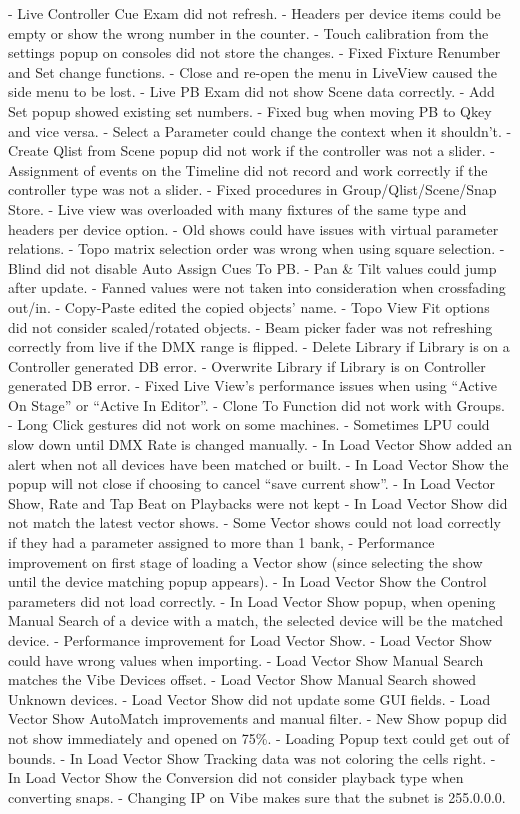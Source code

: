 \documentclass[
]{article}
\begin{document}
- Live Controller Cue Exam did not refresh.
- Headers per device items could be empty or show the wrong number in the counter.
- Touch calibration from the settings popup on consoles did not store the changes.
- Fixed Fixture Renumber and Set change functions.
- Close and re-open the menu in LiveView caused the side menu to be lost.
- Live PB Exam did not show Scene data correctly.
- Add Set popup showed existing set numbers.
- Fixed bug when moving PB to Qkey and vice versa.
- Select a Parameter could change the context when it shouldn't.
- Create Qlist from Scene popup did not work if the controller was not a slider.
- Assignment of events on the Timeline did not record and work correctly if the controller type was not a slider.
- Fixed procedures in Group/Qlist/Scene/Snap Store.
- Live view was overloaded with many fixtures of the same type and headers per device option.
- Old shows could have issues with virtual parameter relations.
- Topo matrix selection order was wrong when using square selection.
- Blind did not disable Auto Assign Cues To PB.
- Pan \& Tilt values could jump after update.
- Fanned values were not taken into consideration when crossfading out/in.
- Copy-Paste edited the copied objects' name.
- Topo View Fit options did not consider scaled/rotated objects.
- Beam picker fader was not refreshing correctly from live if the DMX range is flipped.
- Delete Library if Library is on a Controller generated DB error.
- Overwrite Library if Library is on Controller generated DB error.
- Fixed Live View's performance issues when using ``Active On Stage'' or ``Active In Editor''.
- Clone To Function did not work with Groups.
- Long Click gestures did not work on some machines.
- Sometimes LPU could slow down until DMX Rate is changed manually.
- In Load Vector Show added an alert when not all devices have been matched or built.
- In Load Vector Show the popup will not close if choosing to cancel ``save current show''.
- In Load Vector Show, Rate and Tap Beat on Playbacks were not kept
- In Load Vector Show did not match the latest vector shows.
- Some Vector shows could not load correctly if they had a parameter assigned to more than 1 bank,
- Performance improvement on first stage of loading a Vector show (since selecting the show until the device matching popup appears).
- In Load Vector Show the Control parameters did not load correctly.
- In Load Vector Show popup, when opening Manual Search of a device with a match, the selected device will be the matched device.
- Performance improvement for Load Vector Show.
- Load Vector Show could have wrong values when importing.
- Load Vector Show Manual Search matches the Vibe Devices offset.
- Load Vector Show Manual Search showed Unknown devices.
- Load Vector Show did not update some GUI fields.
- Load Vector Show AutoMatch improvements and manual filter.
- New Show popup did not show immediately and opened on 75\%.
- Loading Popup text could get out of bounds.
- In Load Vector Show Tracking data was not coloring the cells right.
- In Load Vector Show the Conversion did not consider playback type when converting snaps.
- Changing IP on Vibe makes sure that the subnet is 255.0.0.0.
\end{document}
